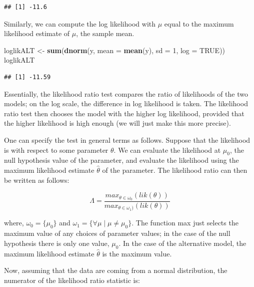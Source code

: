 \documentclass[12pt,]{krantz}
\newenvironment{Shaded}{\begin{snugshade}}{\end{snugshade}}
\newcommand{\DataTypeTok}[1]{\textcolor[rgb]{0.13,0.29,0.53}{#1}}
\newcommand{\DecValTok}[1]{\textcolor[rgb]{0.00,0.00,0.81}{#1}}
\newcommand{\KeywordTok}[1]{\textcolor[rgb]{0.13,0.29,0.53}{\textbf{#1}}}
\newcommand{\NormalTok}[1]{#1}
\newcommand{\OtherTok}[1]{\textcolor[rgb]{0.56,0.35,0.01}{#1}}
\newcommand{\StringTok}[1]{\textcolor[rgb]{0.31,0.60,0.02}{#1}}
\begin{document}
\begin{verbatim}
## [1] -11.6
\end{verbatim}

Similarly, we can compute the log likelihood with \(\mu\) equal to the maximum likelihood estimate of \(\mu\), the sample mean.

\begin{Shaded}
\begin{Highlighting}[]
\NormalTok{loglikALT <-}\StringTok{ }\KeywordTok{sum}\NormalTok{(}\KeywordTok{dnorm}\NormalTok{(y, }\DataTypeTok{mean =} \KeywordTok{mean}\NormalTok{(y), }\DataTypeTok{sd =} \DecValTok{1}\NormalTok{, }\DataTypeTok{log =} \OtherTok{TRUE}\NormalTok{))}
\NormalTok{loglikALT}
\end{Highlighting}
\end{Shaded}

\begin{verbatim}
## [1] -11.59
\end{verbatim}

Essentially, the likelihood ratio test compares the ratio of likelihoods of the two models; on the log scale, the difference in log likelihood is taken.
The likelihood ratio test then chooses the model with the higher log likelihood, provided that the higher likelihood is high enough (we will just make this more precise).

One can specify the test in general terms as follows. Suppose that the likelihood is with respect to some parameter \(\theta\). We can evaluate the likelihood at \(\mu_0\), the null hypothesis value of the parameter, and evaluate the likelihood using the maximum likelihood estimate \(\hat\theta\) of the parameter. The likelihood ratio can then be written as follows:

\begin{equation}
\Lambda = \frac{max_{\theta\in \omega_0}(lik(\theta))}{max_{\theta\in \omega_1)}(lik(\theta))}
\end{equation}

where, \(\omega_0=\{\mu_0\}\) and \(\omega_1=\{\forall \mu \mid \mu\neq \mu_0\}\). The function max just selects the maximum value of any choices of parameter values; in the case of the null hypothesis there is only one value, \(\mu_0\). In the case of the alternative model, the maximum likelihood estimate \(\hat\theta\) is the maximum value.

Now, assuming that the data are coming from a normal distribution, the numerator of the likelihood ratio statistic is:
\end{document}
